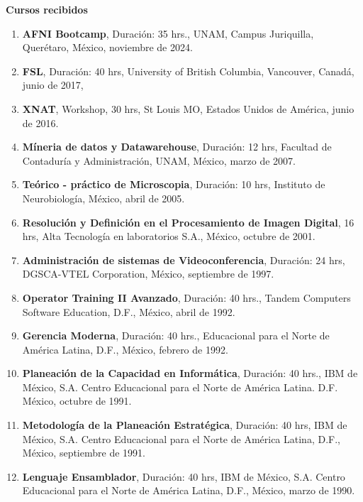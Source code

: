 {\large \textbf{Cursos recibidos}}

\hrulefill

\begin{enumerate}

\item \textbf{AFNI Bootcamp}, Duración: 35 hrs., UNAM, Campus Juriquilla, Querétaro, México, noviembre de 2024.

\item \textbf{FSL}, Duración: 40 hrs, University of British Columbia, Vancouver, Canadá, junio de 2017,

\item \textbf{XNAT}, Workshop, 30 hrs, St Louis MO, Estados Unidos de América, junio de 2016.

\item \textbf{Míneria de datos y Datawarehouse}, Duración: 12 hrs, Facultad de Contaduría y Administración, UNAM, México, marzo de 2007.

\item \textbf{Teórico - práctico de Microscopia}, Duración: 10 hrs, Instituto de Neurobiología, México, abril de 2005.

\item \textbf{Resolución y Definición en el Procesamiento de Imagen Digital}, 16 hrs, Alta Tecnología en laboratorios S.A., México, octubre 
de 2001.

\item \textbf{Administración de sistemas de Videoconferencia}, Duración: 24 hrs, DGSCA-VTEL Corporation, México, septiembre de 1997.

\item \textbf{Operator Training II Avanzado}, Duración: 40 hrs., Tandem Computers Software Education, D.F., México, abril de 1992.

\item \textbf{Gerencia Moderna}, Duración: 40 hrs., Educacional para el Norte de América Latina, D.F., México, febrero de 1992.

\item \textbf{Planeación de la Capacidad en Informática}, Duración: 40 hrs., IBM de México, S.A. Centro Educacional para el Norte de América 
Latina. D.F. 
México, octubre de 1991.

\item \textbf{Metodología de la Planeación Estratégica}, Duración: 40 hrs, IBM de México, S.A. Centro Educacional para el Norte de América 
Latina, D.F., 
México, septiembre de 1991.

\item \textbf{Lenguaje Ensamblador}, Duración: 40 hrs, IBM de México, S.A. Centro Educacional para el Norte de América Latina, D.F., México, 
marzo de 1990.


\end{enumerate}
